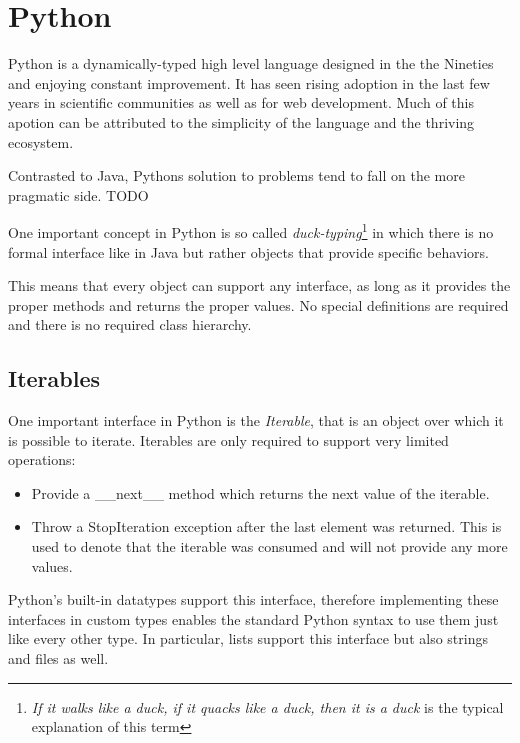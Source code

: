 \documentclass[parskip=half]{scrreprt}
\newcommand\inline[1]{{\addfontfeature{Letters=SmallCaps}#1}}
\begin{document}
\section{Python}
\label{sec:python}

Python is a dynamically-typed high level language designed in the the Nineties
and enjoying constant improvement. It has seen rising adoption in the last few
years in scientific communities as well as for web development. Much of this
apotion can be attributed to the simplicity of the language and the thriving
ecosystem.

Contrasted to Java, Pythons solution to problems tend to fall on the more
pragmatic side. TODO

One important concept in Python is so called
\emph{duck-typing}\footnote{\emph{If it walks like a duck, if it quacks like a
duck, then it is a duck} is the typical explanation of this term} in which
there is no formal interface like in Java but rather objects that provide
specific behaviors.

This means that every object can support any interface, as long as it provides
the proper methods and returns the proper values. No special definitions are
required and there is no required class hierarchy.

\subsection{Iterables}
\label{sec:pyiterable}

One important interface in Python is the \emph{Iterable}, that is an object
over which it is possible to iterate. Iterables are only required to support
very limited operations:

\begin{itemize}

  \item Provide a \inline{\_\_next\_\_} method which returns the next value of
	  the iterable.

  \item Throw a \inline{StopIteration} exception after the last element was
	  returned.  This is used to denote that the iterable was consumed and
	  will not provide any more values.

\end{itemize}

Python's built-in datatypes support this interface, therefore implementing
these interfaces in custom types enables the standard Python syntax to use them
just like every other type. In particular, lists support this interface but
also strings and files as well.
\end{document}
